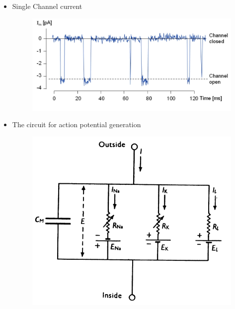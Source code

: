 \documentclass[english,11pt]{article}
\begin{document}
\begin{itemize}
\item Single Channel current

\begin{figure}[htbp]
\centering
  \includegraphics[scale=0.45]{images/5_6.jpg}
\end{figure} 

\item The circuit for action potential generation

\begin{figure}[htbp]
\centering
  \includegraphics[scale=0.4]{images/5_5.jpg}
\end{figure} 

\end{itemize}


\end{document}
